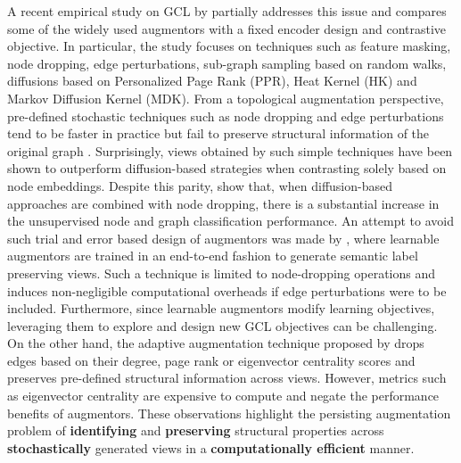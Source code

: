 \documentclass{article}
\theoremstyle{plain}
\theoremstyle{definition}
\theoremstyle{remark}
\begin{document}
A recent empirical study on GCL by \citet{zhu2021empirical} partially addresses this issue and compares some of the widely used augmentors with a fixed encoder design and contrastive objective. In particular, the study focuses on techniques such as feature masking, node dropping, edge perturbations, sub-graph sampling based on random walks, diffusions based on Personalized Page Rank (PPR), Heat Kernel (HK) and Markov Diffusion Kernel (MDK). From a topological augmentation perspective, pre-defined stochastic techniques such as node dropping and edge perturbations  tend to be faster in practice but fail to preserve structural information of the original graph \citep{hubler2008metropolis}. Surprisingly, views obtained by such simple techniques have been shown to outperform diffusion-based strategies when contrasting solely based on node embeddings. Despite this parity, \citet{zhu2021empirical} show that, when diffusion-based approaches are combined with node dropping, there is a substantial increase in the unsupervised node and graph classification performance. An attempt to avoid such trial and error based design of augmentors was made by \citet{yin2022autogcl}, where learnable augmentors are trained in an end-to-end fashion to generate semantic label preserving views. Such a technique is limited to node-dropping operations and induces non-negligible computational overheads if edge perturbations were to be included. Furthermore, since learnable augmentors modify learning objectives, leveraging them to explore and design new GCL objectives can be challenging. On the other hand, the adaptive augmentation technique proposed by \citet{zhu2021graph} drops edges based on their degree, page rank or eigenvector centrality scores and preserves pre-defined structural information across views. However, metrics such as eigenvector centrality are expensive to compute and negate the performance benefits of augmentors. These observations highlight the persisting augmentation problem of \textbf{identifying} and \textbf{preserving} structural properties across \textbf{stochastically} generated views in a \textbf{computationally efficient} manner.
\end{document}
